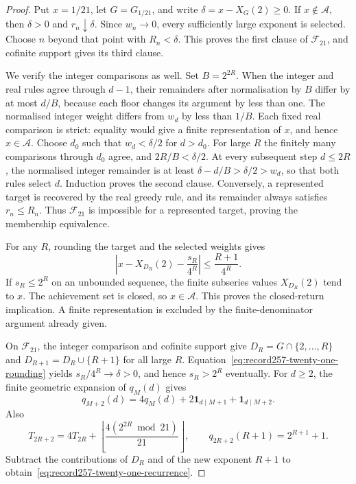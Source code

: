 \begin{proof}
Put $x=1/21$, let $G=G_{1/21}$, and write $\delta=x-X_G(2)\ge0$.
If $x\notin\mathcal A$, then $\delta>0$ and $r_n\downarrow\delta$.
Since $w_n\to0$, every sufficiently large exponent is selected. Choose
$n$ beyond that point with $R_n<\delta$. This proves the first clause of
$\mathcal F_{21}$, and cofinite support gives its third clause.

We verify the integer comparisons as well. Set $B=2^{2R}$. When the
integer and real rules agree through $d-1$, their remainders after
normalisation by $B$ differ by at most $d/B$, because each floor changes
its argument by less than one. The normalised integer weight differs
from $w_d$ by less than $1/B$. Each fixed real comparison is strict:
equality would give a finite representation of $x$, and hence
$x\in\mathcal A$. Choose $d_0$ such that $w_d<\delta/2$ for $d>d_0$.
For large $R$ the finitely many comparisons through $d_0$ agree, and
$2R/B<\delta/2$. At every subsequent step $d\le2R$, the normalised
integer remainder is at least $\delta-d/B>\delta/2>w_d$, so that both
rules select $d$. Induction proves the second clause. Conversely, a
represented target is recovered by the real greedy rule, and its
remainder always satisfies $r_n\le R_n$. Thus $\mathcal F_{21}$ is
impossible for a represented target, proving the membership equivalence.

For any $R$, rounding the target and the selected weights gives
\begin{equation}
 \left|x-X_{D_R}(2)-\frac{s_R}{4^R}\right|
 \le\frac{R+1}{4^R}.
 \label{eq:record257-twenty-one-rounding}
\end{equation}
If $s_R\le2^R$ on an unbounded sequence, the finite subseries values
$X_{D_R}(2)$ tend to $x$. The achievement set is closed, so $x\in\mathcal A$.
This proves the closed-return implication. A finite representation is
excluded by the finite-denominator argument already given.

On $\mathcal F_{21}$, the integer comparison and cofinite support give
$D_R=G\cap\{2,\ldots,R\}$ and $D_{R+1}=D_R\cup\{R+1\}$ for all large
$R$. Equation~\eqref{eq:record257-twenty-one-rounding} yields
$s_R/4^R\to\delta>0$, and hence $s_R>2^R$ eventually. For $d\ge2$,
the finite geometric expansion of $q_M(d)$ gives
\[
 q_{M+2}(d)=4q_M(d)+2\mathbf1_{d\mid M+1}+\mathbf1_{d\mid M+2}.
\]
Also
\[
 T_{2R+2}=4T_{2R}+
 \left\lfloor\frac{4(2^{2R}\bmod21)}{21}\right\rfloor,
 \qquad q_{2R+2}(R+1)=2^{R+1}+1.
\]
Subtract the contributions of $D_R$ and of the new exponent $R+1$ to
obtain~\eqref{eq:record257-twenty-one-recurrence}.
\end{proof}

